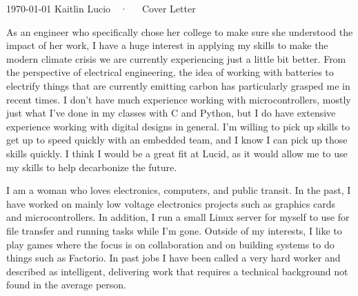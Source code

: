 \documentclass[11pt, a4paper]{awesome-cv}
\begin{document}
\makecvheader[R]

\makecvfooter
  {\today}
  {Kaitlin Lucio~~·~~~Cover Letter}
  {}

\makelettertitle

\begin{cvletter}

As an engineer who specifically chose her college to make sure she understood the impact of her work, I have a huge interest in applying my skills to make the modern climate crisis we are currently experiencing just a little bit better. From the perspective of electrical engineering, the idea of working with batteries to electrify things that are currently emitting carbon has particularly grasped me in recent times. I don't have much experience working with microcontrollers, mostly just what I've done in my classes with C and Python, but I do have extensive experience working with digital designs in general. I'm willing to pick up skills to get up to speed quickly with an embedded team, and I know I can pick up those skills quickly. I think I would be a great fit at Lucid, as it would allow me to use my skills to help decarbonize the future.

I am a woman who loves electronics, computers, and public transit. In the past, I have worked on mainly low voltage electronics projects such as graphics cards and microcontrollers. In addition, I run a small Linux server for myself to use for file transfer and running tasks while I'm gone. Outside of my interests, I like to play games where the focus is on collaboration and on building systems to do things such as Factorio. In past jobs I have been called a very hard worker and described as intelligent, delivering work that requires a technical background not found in the average person.

\end{cvletter}


\makeletterclosing
\end{document}
